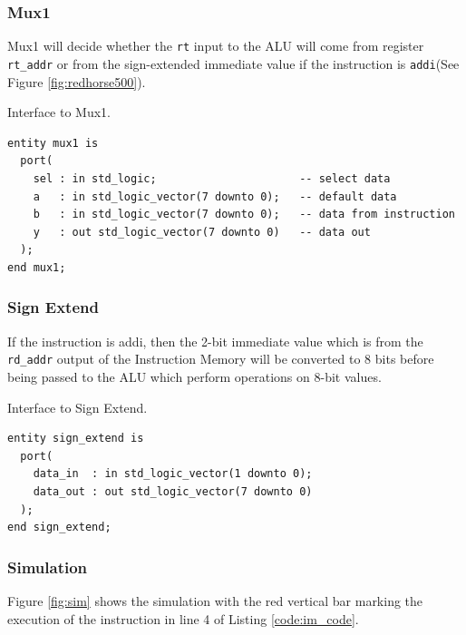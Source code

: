 \documentclass[a4paper, 11pt,oneside]{article}
\begin{document}
\subsubsection{Mux1}
Mux1 will decide whether the \texttt{rt} input to the ALU will come 
from register \texttt{rt_addr} or from the sign-extended immediate 
value if the instruction is \texttt{addi}(See Figure 
\ref{fig:redhorse500}).

\begin{listing}[H]
\caption{Interface to Mux1.}
\label{code:mux1}
\begin{verbatim}
entity mux1 is
  port(
    sel : in std_logic;                      -- select data
    a   : in std_logic_vector(7 downto 0);   -- default data
    b   : in std_logic_vector(7 downto 0);   -- data from instruction
    y   : out std_logic_vector(7 downto 0)   -- data out
  );
end mux1;
\end{verbatim}
\end{listing}


\subsubsection{Sign Extend}
If the instruction is addi, then the 2-bit immediate value which is from the 
\texttt{rd_addr} output of the Instruction Memory will be converted 
to 8 bits before being passed to the ALU which perform operations on 8-bit 
values.
\begin{listing}[H]
\caption{Interface to Sign Extend.}
\label{code:sign_extend}
\begin{verbatim}
entity sign_extend is
  port(
    data_in  : in std_logic_vector(1 downto 0);
    data_out : out std_logic_vector(7 downto 0)
  );
end sign_extend;
\end{verbatim}
\end{listing}

\subsubsection{Simulation}
Figure \ref{fig:sim} shows the simulation with the red vertical bar marking the 
execution of the instruction in line 4 of Listing \ref{code:im_code}.
\end{document}
